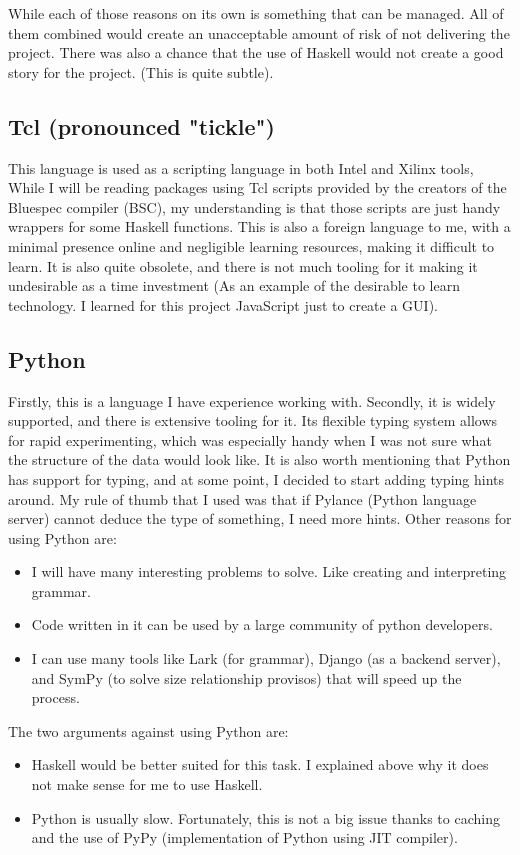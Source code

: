 \documentclass[12pt]{report}
\begin{document}
While each of those reasons on its own is something that can be managed. All of them combined would create an unacceptable amount of risk of not delivering the project. There was also a chance that the use of Haskell would not create a good story for the project. (This is quite subtle). 

\subsection{Tcl (pronounced "tickle")}
This language is used as a scripting language in both Intel and Xilinx tools, While I will be reading packages using Tcl scripts provided by the creators of the Bluespec compiler (BSC), my understanding is that those scripts are just handy wrappers for some Haskell functions. This is also a foreign language to me, with a minimal presence online and negligible learning resources, making it difficult to learn. It is also quite obsolete, and there is not much tooling for it making it undesirable as a time investment (As an example of the desirable to learn technology. I learned for this project JavaScript just to create a GUI). 
\subsection{Python}
Firstly, this is a language I have experience working with. Secondly, it is widely supported, and there is extensive tooling for it. Its flexible typing system allows for rapid experimenting, which was especially handy when I was not sure what the structure of the data would look like. It is also worth mentioning that Python has support for typing, and at some point, I decided to start adding typing hints around. My rule of thumb that I used was that if Pylance (Python language server) cannot deduce the type of something, I need more hints.  
Other reasons for using Python are:  
\begin{itemize}  
  \item I will have many interesting problems to solve. Like creating and interpreting grammar.  
  \item Code written in it can be used by a large community of python developers.  
  \item I can use many tools like Lark (for grammar), Django (as a backend server), and SymPy (to solve size relationship provisos) that will speed up the process.  
\end{itemize}  
The two arguments against using Python are:  
\begin{itemize}  
  \item Haskell would be better suited for this task. I explained above why it does not make sense for me to use Haskell.  
  \item Python is usually slow. Fortunately, this is not a big issue thanks to caching and the use of PyPy (implementation of Python using JIT compiler).  
\end{itemize} 
\end{document}
